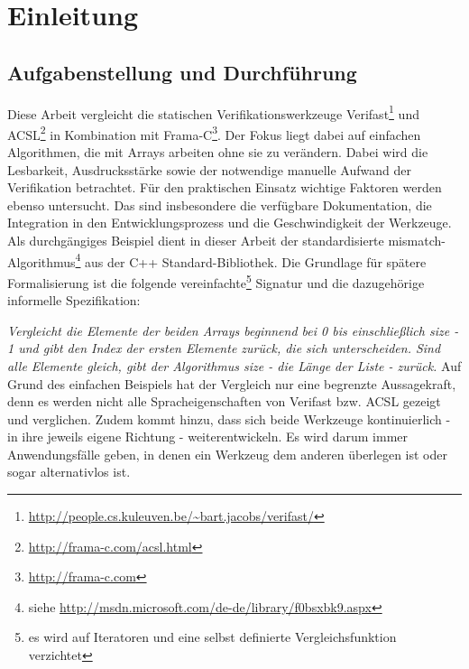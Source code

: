﻿\chapter{Einleitung}

\section{Aufgabenstellung und Durchführung}
\label{sec:aufgabenstellung}
Diese Arbeit vergleicht die statischen Verifikationswerkzeuge Verifast\footnote{
\url{http://people.cs.kuleuven.be/~bart.jacobs/verifast/}} und ACSL\footnote{\url{http://frama-c.com/acsl.html}} 
in Kombination mit Frama-C\footnote{\url{http://frama-c.com}}. 
Der Fokus liegt dabei auf einfachen Algorithmen, die mit Arrays arbeiten ohne sie zu verändern.
Dabei wird die Lesbarkeit, Ausdrucksstärke sowie der notwendige manuelle Aufwand der Verifikation betrachtet.
Für den praktischen Einsatz wichtige Faktoren werden ebenso untersucht. Das sind insbesondere die verfügbare 
Dokumentation, die Integration in den Entwicklungsprozess und die Geschwindigkeit der Werkzeuge.
\newline
\newline
Als durchgängiges Beispiel dient in dieser Arbeit der standardisierte mismatch-Algorithmus\footnote{siehe
\url{http://msdn.microsoft.com/de-de/library/f0bsxbk9.aspx}} aus
der C++ Standard-Bibliothek. Die Grundlage für spätere Formalisierung ist die folgende vereinfachte\footnote{es
wird auf Iteratoren und eine selbst definierte Vergleichsfunktion verzichtet} Signatur und 
die dazugehörige informelle Spezifikation:

\lstset{frame=none, numbers=none}    

\lstset{frame=single, numbers=left}

\noindent \emph{Vergleicht die Elemente der beiden Arrays beginnend bei 0 bis einschließlich size - 1 und gibt den
Index der ersten Elemente zurück, die sich unterscheiden. Sind alle Elemente gleich, gibt der Algorithmus
size - die Länge der Liste - zurück.}
\newline
\newline
Auf Grund des einfachen Beispiels hat der Vergleich nur eine begrenzte Aussagekraft, denn es werden nicht alle
Spracheigenschaften von Verifast bzw. ACSL gezeigt und verglichen. Zudem kommt hinzu, dass sich beide Werkzeuge
kontinuierlich - in ihre jeweils eigene Richtung - weiterentwickeln. Es wird darum immer Anwendungsfälle geben,
in denen ein Werkzeug dem anderen überlegen ist oder sogar alternativlos ist.


